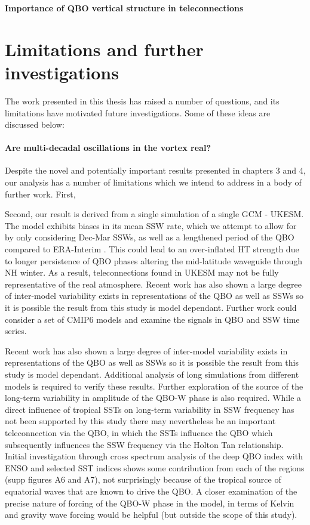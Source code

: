 \textbf{Importance of QBO vertical structure in teleconnections}

\section{Limitations and further investigations}
\label{sec:limitations}
The work presented in this thesis has raised a number of questions, and its limitations have motivated future investigations. Some of these ideas are
discussed below:

\paragraph{Are multi-decadal oscillations in the vortex real?}
Despite the novel and potentially important results presented in chapters 3 and 4, our analysis has a number of limitations which we intend to address in a body of further work. First,

Second, our result is derived from a single simulation of a single GCM - UKESM. The model exhibits biases in its mean SSW rate, which we attempt to allow for by only considering Dec-Mar SSWs, as well as a lengthened period of the QBO compared to ERA-Interim \citep{bushellEvaluation2020}. This could lead to an over-inflated HT strength due to longer persistence of QBO phases altering the mid-latitude waveguide through NH winter. As a result, teleconnections found in UKESM may not be fully representative of the real atmosphere. Recent work has also shown a large degree of inter-model variability exists in representations of the QBO as well as SSWs \citep{bushellEvaluation2020,ayarzaguenaUncertainty2020} so it is possible the result from this study is model dependant. Further work could consider a set of CMIP6 models and examine the signals in QBO and SSW time series. 

Recent work has also shown a large degree of inter-model variability exists in representations of the QBO as well as SSWs \citep{bushellEvaluation2020,ayarzaguenaUncertainty2020} so it is possible the result from this study is model dependant. Additional analysis of long simulations from different models is required to verify these results. 
Further exploration of the source of the long-term variability in amplitude of the QBO-W phase is also required. While a direct influence of tropical SSTs on long-term variability in SSW frequency has not been supported by this study there may nevertheless be an important teleconnection via the QBO, in which the SSTs influence the QBO which subsequently influences the SSW frequency via the Holton Tan relationship. Initial investigation through cross spectrum analysis of the deep QBO index with ENSO and selected SST indices shows some contribution from each of the regions (supp figures A6 and A7), not surprisingly because of the tropical source of equatorial waves that are known to drive the QBO. A closer examination of the precise nature of forcing of the QBO-W phase in the model, in terms of Kelvin and gravity wave forcing would be helpful (but outside the scope of this study).


